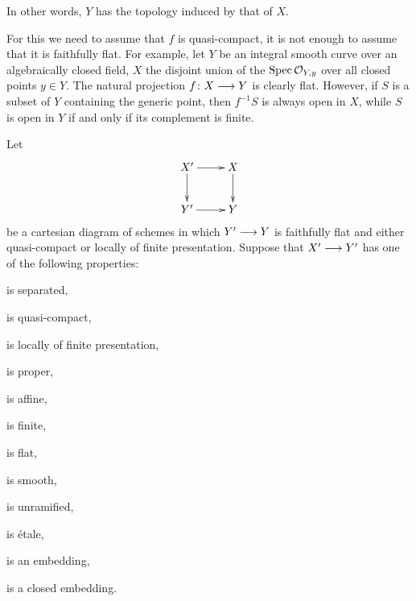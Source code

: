 \begin{1   PRELIMINARY NOTIONS}
\begin{1.1 Algebraic geometry}
In other words, $Y$ has the topology induced by that of $X$.

\begin{remark}\label{rmk:need-finiteness}
For this we need to assume that $f$ is quasi-compact, it is not enough to assume that it is faithfully flat. For example, let $Y$ be an integral smooth curve over an algebraically closed field, $X$ the disjoint union of the $\operatorname{Spec}\mathcal{O}_{Y,y}$ over all closed points $y \in Y$. The natural projection $f \colon X \arr Y$ is clearly flat. However, if $S$ is a subset of $Y$ containing the generic point, then $f^{-1}S$ is always open in $X$, while $S$ is open in $Y$ if and only if its complement is finite.
\end{remark}

\begin{proposition}
\label{prop:local-qcflat}
Let
   \[
   \xymatrix{
   X' \ar[r] \ar[d] &
   X \ar[d] \\
   Y' \ar[r] &
   Y
   }
   \]
be a cartesian diagram of schemes in which $Y' \arr Y$ is faithfully flat and either quasi-compact or locally of finite presentation. Suppose that $X' \arr Y'$ has one of the following properties:
\begin{enumeratei}

\item is separated,

\item is quasi-compact,

\item is locally of finite presentation,

\item is proper,

\item is affine,

\item is finite,

\item is flat,

\item is smooth, 

\item is unramified,

\item is \'etale,

\item is an embedding,

\item is a closed embedding.

\end{enumeratei}


\end{proposition}
\end{1.1 Algebraic geometry}
\end{1   PRELIMINARY NOTIONS}
